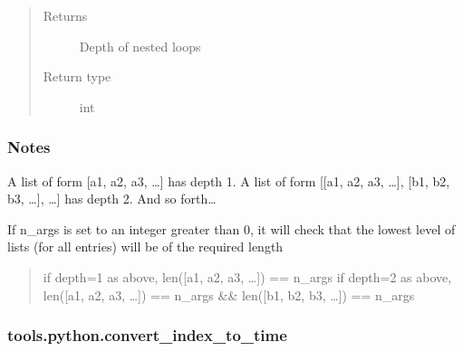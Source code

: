\documentclass[letterpaper,10pt,english]{sphinxmanual}
\begin{document}
\begin{fulllineitems}
\begin{quote}
\begin{description}
\begin{itemize}
\end{itemize}

\item[{Returns}] \leavevmode
\sphinxAtStartPar
{} \textendash{} Depth of nested loops

\item[{Return type}] \leavevmode
\sphinxAtStartPar
int

\end{description}\end{quote}
\subsubsection*{Notes}

\sphinxAtStartPar
A list of form {[}a1, a2, a3, …{]} has depth 1.
A list of form {[}{[}a1, a2, a3, …{]}, {[}b1, b2, b3, …{]}, …{]} has depth 2.
And so forth…

\sphinxAtStartPar
If n\_args is set to an integer greater than 0, it will check that the lowest level of lists (for all entries)
will be of the required length
\begin{quote}

\sphinxAtStartPar
if depth=1 as above, len({[}a1, a2, a3, …{]}) == n\_args
if depth=2 as above, len({[}a1, a2, a3, …{]}) == n\_args \&\& len({[}b1, b2, b3, …{]}) == n\_args
\end{quote}

\end{fulllineitems}



\subsubsection{tools.python.convert\_index\_to\_time}
\label{\detokenize{_autosummary/tools.python.convert_index_to_time:tools-python-convert-index-to-time}}\label{\detokenize{_autosummary/tools.python.convert_index_to_time::doc}}
\end{document}
